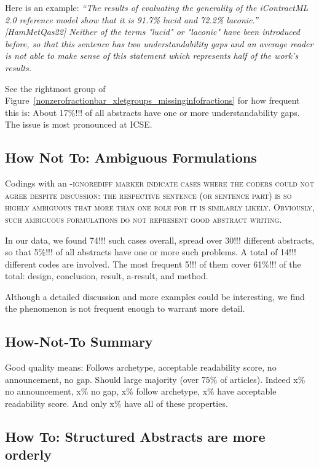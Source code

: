 \documentclass[10pt,journal,compsoc]{IEEEtran}
\newcommand{\Cb}[1]{\bgroup\scshape #1\egroup}  %
\newcommand{\Art}[1]{\bgroup[#1]\egroup} %
\newcommand{\Quote}[1]{\bgroup\itshape ``#1''\egroup}  %
\begin{document}
Here is an example:
\Quote{The results of evaluating the generality of the iContractML 2.0 reference model show
  that it is 91.7\% lucid and 72.2\% laconic.} \Art{HamMetQas22}
Neither of the terms "lucid" or "laconic" have been introduced before, so that
this sentence has two understandability gaps and
an average reader is not able to make sense of this statement
which represents half of the work's results.

See the rightmost group of Figure~\ref{nonzerofractionbar_xletgroups_missinginfofractions}
for how frequent this is:
About 17\%!!! of all abstracts have one or more understandability gaps.
The issue is most pronounced at ICSE.


\subsection{How Not To: Ambiguous Formulations}\label{ambiguity}

Codings with an \Cb{-ignorediff} marker indicate cases where the coders could not agree
despite discussion: the respective sentence (or sentence part) is so highly ambiguous that
more than one role for it is similarly likely.
Obviously, such ambiguous formulations do not represent good abstract writing.

In our data, we found 74!!! such cases overall, spread over 30!!! different abstracts,
so that 5\%!!! of all abstracts have one or more such problems.
A total of 14!!! different codes are involved.
The most frequent 5!!! of them cover 61\%!!! of the total:
design, conclusion, result, a-result, and method.

Although a detailed discussion and more examples could be interesting,
we find the phenomenon is not frequent enough to warrant more detail.


\subsection{How-Not-To Summary}\label{hownotto_summary}

Good quality means: Follows archetype, acceptable readability score, no announcement, no gap.
Should large majority (over 75\% of articles).
Indeed x\% no announcement, x\% no gap, x\% follow archetype, x\% have acceptable readability score.
And only x\% have all of these properties.


\subsection{How To: Structured Abstracts are more orderly}\label{structuredgood}
\end{document}
